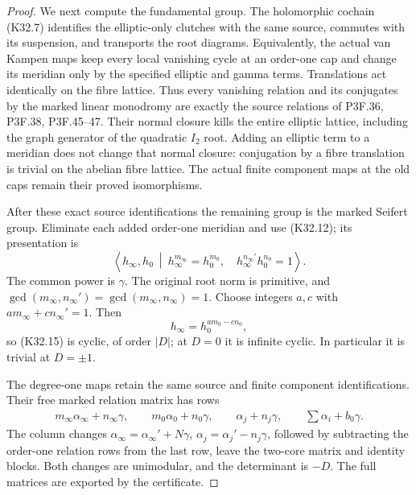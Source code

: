 \begin{proof}
We next compute the fundamental group. The holomorphic
cochain (K32.7) identifies the elliptic-only clutches
with the same source, commutes with its suspension,
and transports the root diagrams. Equivalently, the
actual van Kampen maps keep every local vanishing
cycle at an order-one cap and change its meridian
only by the specified elliptic and gamma terms.
Translations act identically on the fibre lattice.
Thus every vanishing relation and its conjugates by
the marked linear monodromy are exactly the source
relations of P3F.36, P3F.38, P3F.45--47. Their normal
closure kills the entire elliptic lattice, including
the graph generator of the quadratic $I_2$ root.
Adding an elliptic term to a meridian does not change
that normal closure: conjugation by a fibre translation
is trivial on the abelian fibre lattice. The actual
finite component maps at the old caps remain their
proved isomorphisms.

After these exact source identifications the remaining
group is the marked Seifert group. Eliminate each
added order-one meridian and use (K32.12); its
presentation is
\[
 \left\langle h_\infty,h_0\ \middle|\
 h_\infty^{m_\infty}=h_0^{m_0},\quad
 h_\infty^{n_\infty'}h_0^{n_0}=1\right\rangle.          \tag{K32.15}
\]
The common power is $\gamma$. The original root norm
is primitive, and
$\gcd(m_\infty,n_\infty')=
\gcd(m_\infty,n_\infty)=1$. Choose integers $a,c$
with $am_\infty+cn_\infty'=1$. Then
\[
          h_\infty=h_0^{am_0-cn_0},
\]
so (K32.15) is cyclic, of order $|D|$; at $D=0$
it is infinite cyclic. In particular it is trivial
at $D=\pm1$.

The degree-one maps retain the same source and finite
component identifications. Their free marked relation
matrix has rows
\[
 \begin{gathered}
 m_\infty\alpha_\infty+n_\infty\gamma,\qquad
 m_0\alpha_0+n_0\gamma,\qquad
 \alpha_j+n_j\gamma,\qquad
 \sum\alpha_i+b_0\gamma.
 \end{gathered}                                      \tag{K32.16}
\]
The column changes
$\alpha_\infty=\alpha_\infty'+N\gamma$,
$\alpha_j=\alpha_j'-n_j\gamma$, followed by subtracting
the order-one relation rows from the last row, leave
the two-core matrix and identity blocks. Both changes
are unimodular, and the determinant is $-D$.
The full matrices are exported by the certificate.


\end{proof}
